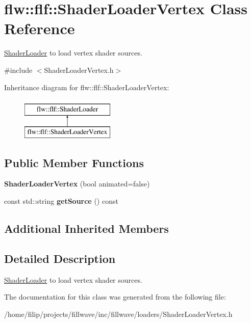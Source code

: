 \hypertarget{classflw_1_1flf_1_1ShaderLoaderVertex}{}\section{flw\+:\+:flf\+:\+:Shader\+Loader\+Vertex Class Reference}
\label{classflw_1_1flf_1_1ShaderLoaderVertex}


\hyperlink{classflw_1_1flf_1_1ShaderLoader}{Shader\+Loader} to load vertex shader sources.  




{\ttfamily \#include $<$Shader\+Loader\+Vertex.\+h$>$}

Inheritance diagram for flw\+:\+:flf\+:\+:Shader\+Loader\+Vertex\+:\begin{figure}[H]
\begin{center}
\leavevmode
\includegraphics[height=2.000000cm]{classflw_1_1flf_1_1ShaderLoaderVertex}
\end{center}
\end{figure}
\subsection*{Public Member Functions}
\begin{DoxyCompactItemize}
\item 
\mbox{\label{classflw_1_1flf_1_1ShaderLoaderVertex_a7b06917586b70d8155ed5f26cd758cd1}} 
{\bfseries Shader\+Loader\+Vertex} (bool animated=false)
\item 
\mbox{\label{classflw_1_1flf_1_1ShaderLoaderVertex_a99de18e1a8164564570508d4b1167eb3}} 
const std\+::string {\bfseries get\+Source} () const
\end{DoxyCompactItemize}
\subsection*{Additional Inherited Members}


\subsection{Detailed Description}
\hyperlink{classflw_1_1flf_1_1ShaderLoader}{Shader\+Loader} to load vertex shader sources. 

The documentation for this class was generated from the following file\+:\begin{DoxyCompactItemize}
\item 
/home/filip/projects/fillwave/inc/fillwave/loaders/Shader\+Loader\+Vertex.\+h\end{DoxyCompactItemize}
